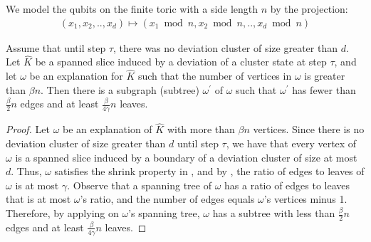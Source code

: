 
\begin{definition}
We model the qubits on the finite toric with a side length $n$ by the projection:
  \begin{equation*}
    \begin{split}
      (x_{1}, x_{2}, .., x_{d}) \mapsto (x_{1}\bmod n, x_{2}\bmod n, .., x_{d}\bmod n) 
    \end{split}
  \end{equation*}
\end{definition}


\begin{claim}
Assume that until step $\tau$, there was no deviation cluster of size greater than $d$. Let $\hat{K}$ be a spanned slice induced by a deviation of a cluster state at step $\tau$, and let $\omega$ be an explanation for $\hat{K}$ such that the number of vertices in $\omega$ is greater than $\beta n$. Then there is a subgraph (subtree) $\omega^{\prime}$ of $\omega$ such that $\omega^{\prime}$ has fewer than $\frac{\beta}{2}n$ edges and at least $\frac{\beta}{4\gamma} n$ leaves.
\end{claim}


\begin{proof}
Let $\omega$ be an explanation of $\hat{K}$ with more than $\beta n$ vertices. Since there is no deviation cluster of size greater than $d$ until step $\tau$, we have that every vertex of $\omega$ is a spanned slice induced by a boundary of a deviation cluster of size at most $d$. Thus, $\omega$ satisfies the shrink property in , and by , the ratio of edges to leaves of $\omega$ is at most $\gamma$.
Observe that a spanning tree of $\omega$ has a ratio of edges to leaves that is at most $\omega$'s ratio, and the number of edges equals $\omega$'s vertices minus 1. Therefore, by applying  on $\omega$'s spanning tree, $\omega$ has a subtree with less than $\frac{\beta}{2}n$ edges and at least $\frac{\beta}{4\gamma} n$ leaves. 
  \end{proof}

